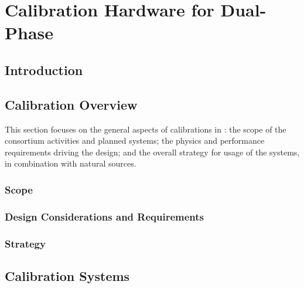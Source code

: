 \chapter{Calibration Hardware for Dual-Phase}
\label{ch:dp-calib}

\section{Introduction}
\label{sec:dp-calib-intro}


%

\section{Calibration Overview}
\label{sec:dp-calib-overview}
This section focuses on the general aspects of calibrations in : the scope of the consortium activities and
planned systems; the physics and performance requirements driving the design; and the overall strategy for usage of the systems, in combination with natural sources.
\subsection{Scope}
\label{sec:dp-calib-scope}

\subsection{Design Considerations and Requirements}
\label{sec:dp-calib-requirements}

\subsection{Strategy}
\label{sec:dp-calib-strategy}


\section{Calibration Systems}
\label{sec:dp-calib-systems}

